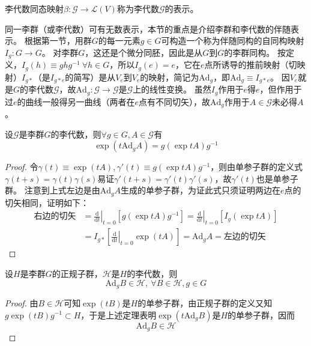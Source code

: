\begin{definition}
    李代数同态映射$\beta \colon \mathscr{G} \to \mathscr{L}(V)$称为李代数$\mathscr{G}$的表示。
\end{definition}

同一李群（或李代数）可有无数表示，本节的重点是介绍李群和李代数的伴随表示。
根据第一节，用群$G$的每一元素$g \in G$可构造一个称为伴随同构的自同构映射$I_g \colon G \to G$。
对李群$G$，这还是个微分同胚，因此是从$G$到$G$的李群同构。
按定义，$I_g(h) \equiv ghg^{-1} ~ \forall h \in G$，所以$I_g(e) = e$，它在$e$点所诱导的推前映射（切映射）$I_{g*}$（是$I_{g*e}$的简写）是从$V_e$到$V_e$的映射，简记为$\mathrm{Ad}_g$，即$\mathrm{Ad}_g \equiv I_{g*e}$。
因$V_e$就是$G$的李代数$\mathscr{G}$，故$\mathrm{Ad}_g \colon \mathscr{G} \to \mathscr{G}$是$\mathscr{G}$上的线性变换。
虽然$I_g$作用于$e$得$e$，但作用于过$e$的曲线一般得另一曲线（两者在$e$点有不同切矢），故$\mathrm{Ad}_g$作用于$A \in \mathscr{G}$未必得$A$。

\begin{theorem}
    设$\mathscr{G}$是李群$G$的李代数，则$\forall g \in G, A \in \mathscr{G}$有
    $$\exp(t\mathrm{Ad}_gA) = g(\exp tA)g^{-1}$$
\end{theorem}

\begin{proof}
    令$\gamma(t) \equiv \exp(tA), \gamma'(t) \equiv g(\exp tA)g^{-1}$，则由单参子群的定义式$\gamma(t + s) = \gamma(t)\gamma(s)$易证$\gamma'(t + s) = \gamma'(t)\gamma'(s)$，故$\gamma'(t)$也是单参子群。
    注意到上式左边是由$\mathrm{Ad}_gA$生成的单参子群，为证此式只须证明两边在$e$点的切矢相同，证明如下：
    \[\begin{split}
        \text{右边的切矢} & = \left.\frac{\mathrm{d}}{\mathrm{d}t}\right|_{t = 0}[g(\exp tA)g^{-1}] = \left.\frac{\mathrm{d}}{\mathrm{d}t}\right|_{t = 0}[I_g(\exp tA)] \\
        & = I_{g*}[\left.\frac{\mathrm{d}}{\mathrm{d}t}\right|_{t = 0}\exp(tA)] = \mathrm{Ad}_gA = \text{左边的切矢}
    \end{split}\]
\end{proof}

\begin{theorem}
    设$H$是李群$G$的正规子群，$\mathscr{H}$是$H$的李代数，则
    $$\mathrm{Ad}_gB \in \mathscr{H}, ~ \forall B \in \mathscr{H}, g \in G$$
\end{theorem}

\begin{proof}
    由$B \in \mathscr{H}$可知$\exp(tB)$是$H$的单参子群，由正规子群的定义又知$g\exp(tB)g^{-1} \subset H$，于是上述定理表明$\exp(t\mathrm{Ad}_gB)$是$H$的单参子群，因而
    $$\mathrm{Ad}_gB \in \mathscr{H}$$
\end{proof}

